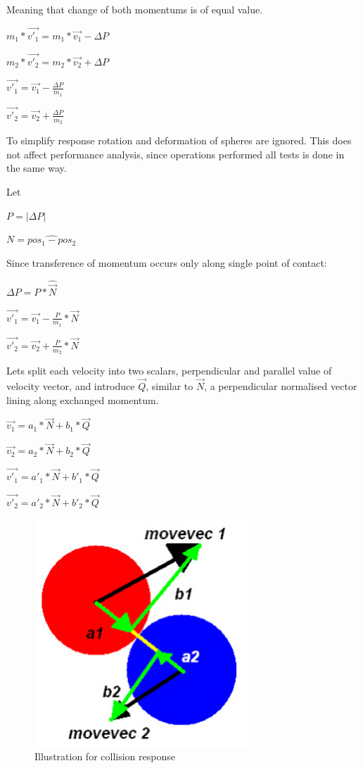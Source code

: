 Meaning that change of both momentums is of equal value.
\begin{center}
$m_1*\vec{v'_1} =  m_1*\vec{v_1} - \Delta P$

$m_2*\vec{v'_2} =  m_2*\vec{v_2} + \Delta P$

$\vec{v'_1} =  \vec{v_1} - \frac{\Delta P}{m_1}$

$\vec{v'_2} =  \vec{v_2} + \frac{\Delta P}{m_2}$
\end{center}

To simplify response rotation and deformation of spheres are ignored. This does not affect performance analysis, since operations performed all tests is done in the same way.

Let
\begin{center}
$P = |\Delta P|$

$N = \hat{pos_1 - pos_2}$
\end{center}

Since transference of momentum occurs only along single point of contact:
\begin{center}
$ \Delta P = P * \hat{\vec{N}}$

$\vec{v'_1} =  \vec{v_1} - \frac{P}{m_1} * \vec{N}$

$\vec{v'_2} =  \vec{v_2} + \frac{P}{m_2} * \vec{N}$
\end{center}

Lets split each velocity into two scalars, perpendicular and parallel value of velocity vector, and introduce $\vec{Q}$, similar to $\vec{N}$, a perpendicular normalised vector lining along exchanged momentum.

 \begin{center}
$\vec{v_1} =  a_1 * \vec{N} + b_1 * \vec{Q}$

$\vec{v_2} =  a_2 * \vec{N} + b_2 * \vec{Q}$

$\vec{v'_1} =  a'_1 * \vec{N} + b'_1 * \vec{Q}$

$\vec{v'_2} =  a'_2 * \vec{N} + b'_2 * \vec{Q}$
\end{center}

\begin{figure}[h!]
  \caption{Illustration for collision response}
  \label{img:spheresbounce}
  \centering
	\includegraphics[width=8cm]{spheres/bounce.jpg}
\end{figure} 

